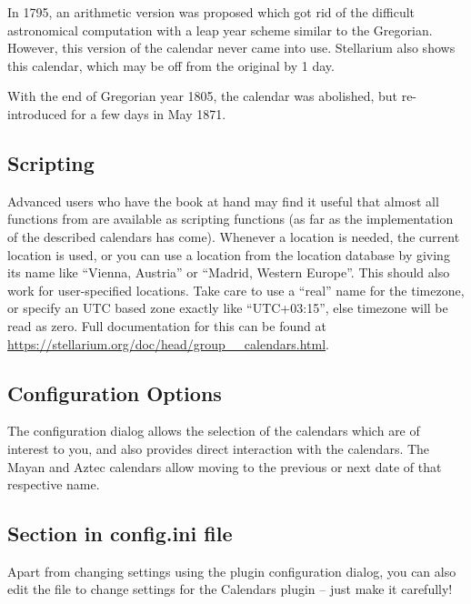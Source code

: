 In 1795, an arithmetic version was proposed which
got rid of the difficult astronomical computation with a leap year
scheme similar to the Gregorian. However, this version of the calendar
never came into use.  Stellarium also shows this calendar, which
may be off from the original by 1 day.

With the end of Gregorian year 1805, the calendar was abolished, but
re-introduced for a few days in May 1871.

\subsection{Scripting}

Advanced users who have the book at hand may find it useful
that almost all functions from
\citet{Reingold-Dershowitz:2018} are available as scripting functions
(as far as the implementation of the described calendars has
come). Whenever a location is needed, the current location is used, or
you can use a location from the location database by giving its name
like ``Vienna, Austria'' or ``Madrid, Western Europe''. This should
also work for user-specified locations. Take care to use a ``real''
name for the timezone, or specify an UTC based zone exactly like
``UTC+03:15'', else timezone will be read as zero. Full documentation
for this can be found at
\url{https://stellarium.org/doc/head/group__calendars.html}.

\subsection{Configuration Options}
\label{sec:plugin:Calendars:configuration}

The configuration dialog allows the selection of the calendars which are
of interest to you, and also provides direct interaction with the calendars.
The Mayan and Aztec calendars allow moving to the previous or next date of that respective name. 

\subsection*{Section  in config.ini file}

Apart from changing settings using the plugin configuration dialog,
you can also edit the  file to change
settings for the Calendars plugin -- just make it carefully!

